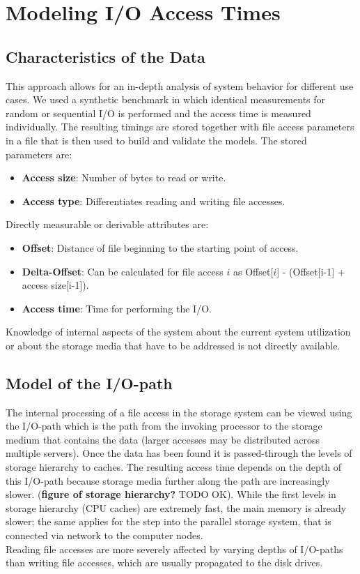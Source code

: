 \documentclass{superfri}
\begin{document}
\section{Modeling I/O Access Times}

\subsection{Characteristics of the Data}
This approach allows for an in-depth analysis of system behavior for different use cases.
We used a synthetic benchmark in which identical measurements for random or sequential I/O is performed and the access time is measured individually. %
The resulting timings are stored together with file access parameters in a file that is then used to build and validate the models.
The stored parameters are:
\begin{itemize}
	\item \textbf{Access size}: Number of bytes to read or write.
	\item \textbf{Access type}: Differentiates reading and writing file accesses.
\end{itemize}
Directly measurable or derivable attributes are:
\begin{itemize}
	\item \textbf{Offset}: Distance of file beginning to the starting point of access.
	\item \textbf{Delta-Offset}: Can be calculated for file access $i$ as Offset[$i$] - (Offset[i-1] + access size[i-1]).
	\item \textbf{Access time}: Time for performing the I/O.
\end{itemize}
Knowledge of internal aspects of the system about the current system utilization or about the storage media that have to be addressed is not directly available.

\subsection{Model of the I/O-path}
The internal processing of a file access in the storage system can be viewed using the I/O-path which is the path from the invoking processor to the storage medium that contains the data (larger accesses may be distributed across multiple servers). 
Once the data has been found it is passed-through the levels of storage hierarchy to caches.
The resulting access time depends on the depth of this I/O-path because storage media further along the path are increasingly slower.
(\textbf{figure of storage hierarchy?} TODO OK).
While the first levels in storage hierarchy (CPU caches) are extremely fast, the main memory is already slower; the same applies for the step into the parallel storage system, that is connected via network to the computer nodes.\\
Reading file accesses are more severely affected by varying depths of I/O-paths than writing file accesses, which are usually propagated to the disk drives.
\end{document}
